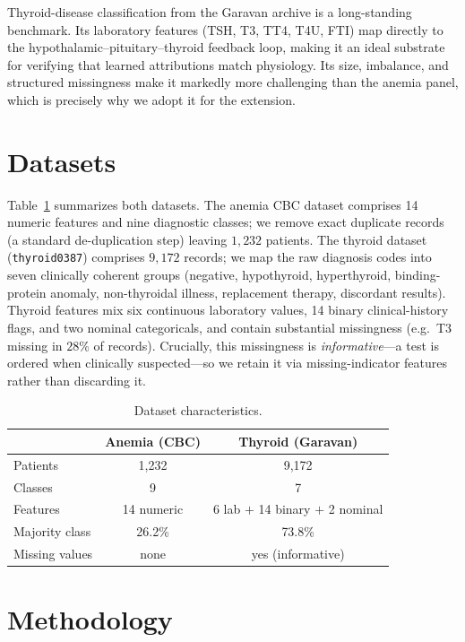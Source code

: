 \documentclass[conference]{IEEEtran}
\begin{document}
Thyroid-disease classification from the Garavan archive is a long-standing
benchmark. Its laboratory features (TSH, T3, TT4, T4U, FTI) map directly to the
hypothalamic--pituitary--thyroid feedback loop, making it an ideal substrate for
verifying that learned attributions match physiology. Its size, imbalance, and
structured missingness make it markedly more challenging than the anemia panel,
which is precisely why we adopt it for the extension.

\section{Datasets}
Table~\ref{tab:data} summarizes both datasets. The anemia CBC dataset comprises
14 numeric features and nine diagnostic classes; we remove exact duplicate
records (a standard de-duplication step) leaving $1{,}232$ patients.
The thyroid dataset (\texttt{thyroid0387}) comprises $9{,}172$ records; we map the
raw diagnosis codes into seven clinically coherent groups (negative, hypothyroid,
hyperthyroid, binding-protein anomaly, non-thyroidal illness, replacement therapy,
discordant results). Thyroid features mix six continuous laboratory values, 14
binary clinical-history flags, and two nominal categoricals, and contain
substantial missingness (e.g.\ T3 missing in $28\%$ of records). Crucially, this
missingness is \emph{informative}---a test is ordered when clinically
suspected---so we retain it via missing-indicator features rather than discarding
it.

\begin{table}[t]
\caption{Dataset characteristics.}
\label{tab:data}
\centering
\renewcommand{\arraystretch}{1.2}
\begin{tabular}{lcc}
\toprule
& \textbf{Anemia (CBC)} & \textbf{Thyroid (Garavan)} \\
\midrule
Patients & 1{,}232 & 9{,}172 \\
Classes & 9 & 7 \\
Features & 14 numeric & 6 lab $+$ 14 binary $+$ 2 nominal \\
Majority class & 26.2\% & 73.8\% \\
Missing values & none & yes (informative) \\
\bottomrule
\end{tabular}
\end{table}

\section{Methodology}
\end{document}
